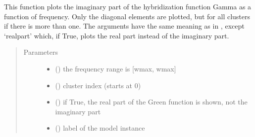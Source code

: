 \documentclass[letterpaper,10pt,english]{sphinxmanual}
\begin{document}
\begin{fulllineitems}
\label{\detokenize{spectral:pyqcm.spectral.hybridization_function}}
\sphinxAtStartPar
This function plots the imaginary part of the hybridization function Gamma as a function of frequency.
Only the diagonal elements are plotted, but for all clusters if there is more than one.
The arguments have the same meaning as in , except ‘realpart’ which, if True, plots
the real part instead of the imaginary part.
\begin{quote}\begin{description}
\item[{Parameters}] \leavevmode\begin{itemize}
\item {} 
\sphinxAtStartPar
{} () \textendash{} the frequency range is {[}\sphinxhyphen{}wmax, wmax{]}

\item {} 
\sphinxAtStartPar
{} () \textendash{} cluster index (starts at 0)

\item {} 
\sphinxAtStartPar
{} () \textendash{} if True, the real part of the Green function is shown, not the imaginary part

\item {} 
\sphinxAtStartPar
{} () \textendash{} label of the model instance


\end{itemize}
\end{description}
\end{quote}
\end{fulllineitems}
\end{document}
